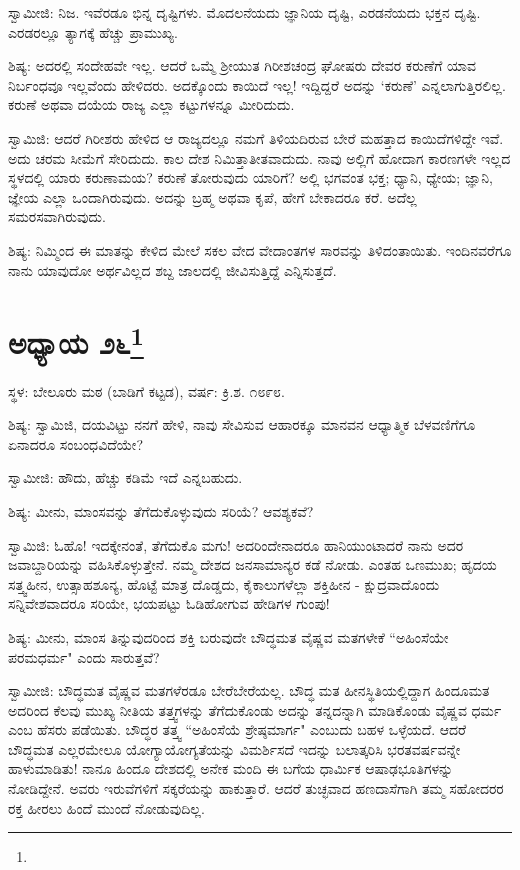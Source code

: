 ಸ್ವಾಮೀಜಿ: ನಿಜ. ಇವೆರಡೂ ಭಿನ್ನ ದೃಷ್ಟಿಗಳು. ಮೊದಲನೆಯದು ಜ್ಞಾನಿಯ ದೃಷ್ಟಿ, ಎರಡನೆಯದು ಭಕ್ತನ ದೃಷ್ಟಿ. ಎರಡರಲ್ಲೂ ತ್ಯಾಗಕ್ಕೆ ಹೆಚ್ಚು ಪ್ರಾಮುಖ್ಯ.

ಶಿಷ್ಯ: ಅದರಲ್ಲಿ ಸಂದೇಹವೇ ಇಲ್ಲ. ಆದರೆ ಒಮ್ಮೆ ಶ‍್ರೀಯುತ ಗಿರೀಶಚಂದ್ರ ಘೋಷರು ದೇವರ ಕರುಣೆಗೆ ಯಾವ ನಿರ್ಬಂಧವೂ ಇಲ್ಲವೆಂದು ಹೇಳಿದರು. ಅದಕ್ಕೊಂದು ಕಾಯಿದೆ ಇಲ್ಲ! ಇದ್ದಿದ್ದರೆ ಅದನ್ನು ‘ಕರುಣೆ’ ಎನ್ನಲಾಗುತ್ತಿರಲಿಲ್ಲ. ಕರುಣೆ ಅಥವಾ ದಯೆಯ ರಾಜ್ಯ ಎಲ್ಲಾ ಕಟ್ಟುಗಳನ್ನೂ ಮೀರಿದುದು.

ಸ್ವಾಮಿಜಿ: ಆದರೆ ಗಿರೀಶರು ಹೇಳಿದ ಆ ರಾಜ್ಯದಲ್ಲೂ ನಮಗೆ ತಿಳಿಯದಿರುವ ಬೇರೆ ಮಹತ್ತಾದ ಕಾಯಿದೆಗಳಿದ್ದೇ ಇವೆ. ಅದು ಚರಮ ಸೀಮೆಗೆ ಸೇರಿದುದು. ಕಾಲ ದೇಶ ನಿಮಿತ್ತಾತೀತವಾದುದು. ನಾವು ಅಲ್ಲಿಗೆ ಹೋದಾಗ ಕಾರಣಗಳೇ ಇಲ್ಲದ ಸ್ಥಳದಲ್ಲಿ ಯಾರು ಕರುಣಾಮಯ? ಕರುಣೆ ತೋರುವುದು ಯಾರಿಗೆ? ಅಲ್ಲಿ ಭಗವಂತ ಭಕ್ತ; ಧ್ಯಾನಿ, ಧ್ಯೇಯ; ಜ್ಞಾನಿ, ಜ್ಞೇಯ ಎಲ್ಲಾ ಒಂದಾಗಿರುವುದು. ಅದನ್ನು ಬ್ರಹ್ಮ ಅಥವಾ ಕೃಪೆ, ಹೇಗೆ ಬೇಕಾದರೂ ಕರೆ. ಅದೆಲ್ಲ ಸಮರಸವಾಗಿರುವುದು.

ಶಿಷ್ಯ: ನಿಮ್ಮಿಂದ ಈ ಮಾತನ್ನು ಕೇಳಿದ ಮೇಲೆ ಸಕಲ ವೇದ ವೇದಾಂತಗಳ ಸಾರವನ್ನು ತಿಳಿದಂತಾಯಿತು. ಇಂದಿನವರೆಗೂ ನಾನು ಯಾವುದೋ ಅರ್ಥವಿಲ್ಲದ ಶಬ್ದ ಜಾಲದಲ್ಲಿ ಜೀವಿಸುತ್ತಿದ್ದೆ ಎನ್ನಿಸುತ್ತದೆ.

\newpage

\chapter[ಅಧ್ಯಾಯ ೨೬]{ಅಧ್ಯಾಯ ೨೬\protect\footnote{}}

\begin{center}
ಸ್ಥಳ: ಬೇಲೂರು ಮಠ (ಬಾಡಿಗೆ ಕಟ್ಟಡ), ವರ್ಷ: ಕ್ರಿ.ಶ. ೧೮೯೮.
\end{center}

ಶಿಷ್ಯ: ಸ್ವಾಮಿಜಿ, ದಯವಿಟ್ಟು ನನಗೆ ಹೇಳಿ, ನಾವು ಸೇವಿಸುವ ಆಹಾರಕ್ಕೂ ಮಾನವನ ಆಧ್ಯಾತ್ಮಿಕ ಬೆಳವಣಿಗೆಗೂ ಏನಾದರೂ ಸಂಬಂಧವಿದೆಯೇ?

ಸ್ವಾಮೀಜಿ: ಹೌದು, ಹೆಚ್ಚು ಕಡಿಮೆ ಇದೆ ಎನ್ನಬಹುದು.

ಶಿಷ್ಯ: ಮೀನು, ಮಾಂಸವನ್ನು ತೆಗೆದುಕೊಳ್ಳುವುದು ಸರಿಯೆ? ಆವಶ್ಯಕವೆ?

ಸ್ವಾಮಿಜಿ: ಓಹೊ! ಇದಕ್ಕೇನಂತೆ, ತೆಗೆದುಕೊ ಮಗು! ಅದರಿಂದೇನಾದರೂ ಹಾನಿಯುಂಟಾದರೆ ನಾನು ಅದರ ಜವಾಬ್ದಾರಿಯನ್ನು ವಹಿಸಿಕೊಳ್ಳುತ್ತೇನೆ. ನಮ್ಮ ದೇಶದ ಜನಸಾಮಾನ್ಯರ ಕಡೆ ನೋಡು. ಎಂತಹ ಒಣಮುಖ; ಹೃದಯ ಸತ್ತ್ವಹೀನ, ಉತ್ಸಾಹಶೂನ್ಯ, ಹೊಟ್ಟೆ ಮಾತ್ರ ದೊಡ್ಡದು, ಕೈಕಾಲುಗಳೆಲ್ಲಾ ಶಕ್ತಿಹೀನ - ಕ್ಷುದ್ರವಾದೊಂದು ಸನ್ನಿವೇಶವಾದರೂ ಸರಿಯೇ, ಭಯಪಟ್ಟು ಓಡಿಹೋಗುವ ಹೇಡಿಗಳ ಗುಂಪು!

ಶಿಷ್ಯ: ಮೀನು, ಮಾಂಸ ತಿನ್ನುವುದರಿಂದ ಶಕ್ತಿ ಬರುವುದೇ ಬೌದ್ಧಮತ ವೈಷ್ಣವ ಮತಗಳೇಕೆ “ಅಹಿಂಸೆಯೇ ಪರಮಧರ್ಮ" ಎಂದು ಸಾರುತ್ತವೆ?

ಸ್ವಾಮೀಜಿ: ಬೌದ್ಧಮತ ವೈಷ್ಣವ ಮತಗಳೆರಡೂ ಬೇರೆಬೇರೆಯಲ್ಲ. ಬೌದ್ಧ ಮತ ಹೀನಸ್ಥಿತಿಯಲ್ಲಿದ್ದಾಗ ಹಿಂದೂಮತ ಅದರಿಂದ ಕೆಲವು ಮುಖ್ಯ ನೀತಿಯ ತತ್ತ್ವಗಳನ್ನು ತೆಗೆದುಕೊಂಡು ಅದನ್ನು ತನ್ನದನ್ನಾಗಿ ಮಾಡಿಕೊಂಡು ವೈಷ್ಣವ ಧರ್ಮ ಎಂಬ ಹೆಸರು ಪಡೆಯಿತು. ಬೌದ್ಧರ ತತ್ತ್ವ “ಅಹಿಂಸೆಯೆ ಶ್ರೇಷ್ಠಮಾರ್ಗ" ಎಂಬುದು ಬಹಳ ಒಳ್ಳೆಯದೆ. ಆದರೆ ಬೌದ್ಧಮತ ಎಲ್ಲರಮೇಲೂ ಯೋಗ್ಯಾಯೋಗ್ಯತೆಯನ್ನು ವಿಮರ್ಶಿಸದೆ ಇದನ್ನು ಬಲಾತ್ಕರಿಸಿ ಭರತವರ್ಷವನ್ನೇ ಹಾಳುಮಾಡಿತು! ನಾನೂ ಹಿಂದೂ ದೇಶದಲ್ಲಿ ಅನೇಕ ಮಂದಿ ಈ ಬಗೆಯ ಧಾರ್ಮಿಕ ಆಷಾಢಭೂತಿಗಳನ್ನು ನೋಡಿದ್ದೇನೆ. ಅವರು ಇರುವೆಗಳಿಗೆ ಸಕ್ಕರೆಯನ್ನು ಹಾಕುತ್ತಾರೆ. ಆದರೆ ತುಚ್ಛವಾದ ಹಣದಾಸೆಗಾಗಿ ತಮ್ಮ ಸಹೋದರರ ರಕ್ತ ಹೀರಲು ಹಿಂದೆ ಮುಂದೆ ನೋಡುವುದಿಲ್ಲ.

